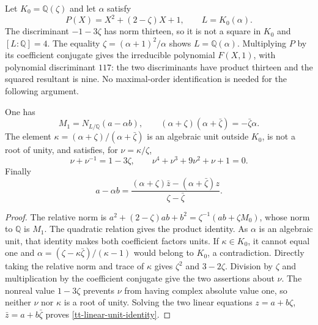 Let $K_0=\mathbb Q(\zeta)$ and let $\alpha$ satisfy
\[
 P(X)=X^2+(2-\zeta)X+1,
 \qquad L=K_0(\alpha).
\]
The discriminant $-1-3\zeta$ has norm thirteen, so it is not a square in
$K_0$ and $[L:\mathbb Q]=4$. The equality
$\zeta=(\alpha+1)^2/\alpha$ shows $L=\mathbb Q(\alpha)$.
Multiplying $P$ by its coefficient conjugate gives the irreducible polynomial
$F(X,1)$, with polynomial discriminant $117$: the two discriminants have
product thirteen and the squared resultant is nine. No maximal-order
identification is needed for the following argument.

\begin{lemma}\label{tt-quartic-unit}
One has
\[
 M_1=N_{L/\mathbb Q}(a-\alpha b),\qquad
 (\alpha+\zeta)(\alpha+\bar\zeta)=-\bar\zeta\alpha.
\]
The element
$\kappa=(\alpha+\zeta)/(\alpha+\bar\zeta)$ is an algebraic unit outside
$K_0$, is not a root of unity, and satisfies, for $\nu=\kappa/\zeta$,
\[
 \nu+\nu^{-1}=1-3\zeta,\qquad
 \nu^4+\nu^3+9\nu^2+\nu+1=0.
\]
Finally
\begin{equation}\label{tt-linear-unit-identity}
 a-\alpha b=
 \frac{(\alpha+\zeta)\bar z-(\alpha+\bar\zeta)z}
 {\zeta-\bar\zeta}.
\end{equation}
\end{lemma}
\begin{proof}
The relative norm is
$a^2+(2-\zeta)ab+b^2=\zeta^{-1}(ab+\zeta M_0)$, whose norm to
$\mathbb Q$ is $M_1$. The quadratic relation gives the product identity.
As $\alpha$ is an algebraic unit, that identity makes both coefficient factors
units. If $\kappa\in K_0$, it cannot equal one and
$\alpha=(\zeta-\kappa\bar\zeta)/(\kappa-1)$ would belong to $K_0$,
a contradiction. Directly taking the relative norm and trace of $\kappa$
gives $\zeta^2$ and $3-2\zeta$. Division by $\zeta$ and multiplication
by the coefficient conjugate give the two assertions about $\nu$.
The nonreal value $1-3\zeta$ prevents $\nu$ from having complex absolute
value one, so neither $\nu$ nor $\kappa$ is a root of unity. Solving the
two linear equations $z=a+b\zeta$, $\bar z=a+b\bar\zeta$ proves
\eqref{tt-linear-unit-identity}.
\end{proof}

